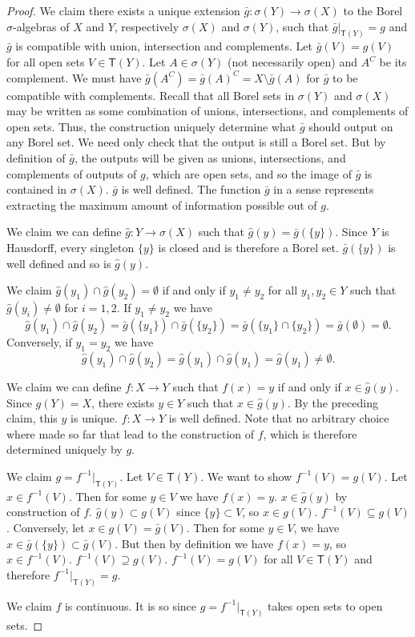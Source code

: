 \documentclass[review]{elsarticle}
\theoremstyle{plain}%
\theoremstyle{definition}
\theoremstyle{remark}
\begin{document}
\begin{proof}
	We claim there exists a unique extension $\bar{g}:\sigma(Y)\to\sigma(X)$ to the Borel $\sigma$-algebras of $X$ and $Y$, respectively $\sigma(X)$ and $\sigma(Y)$, such that $\bar{g}|_{\mathsf{T}(Y)}=g$ and $\bar{g}$ is compatible with union, intersection and complements. Let $\bar{g}(V) = g(V)$ for all open sets $V \in \mathsf{T}(Y)$. Let $A \in \sigma(Y)$ (not necessarily open) and $A^C$ be its complement. We must have $\bar{g}(A^C) = \bar{g}(A)^C = X\setminus \bar{g}(A)$ for $\bar{g}$ to be compatible with complements. Recall that all Borel sets in $\sigma(Y)$ and $\sigma(X)$ may be written as some combination of unions, intersections, and complements of open sets. Thus, the construction uniquely determine what $\bar{g}$ should output on any Borel set. We need only check that the output is still a Borel set. But by definition of $\bar{g}$, the outputs will be given as unions, intersections, and complements of outputs of $g$, which are open sets, and so the image of $\bar{g}$ is contained in $\sigma(X)$.  $\bar{g}$ is well defined. The function $\bar{g}$ in a sense represents extracting the maximum amount of information possible out of $g$.
	
	We claim we can define $\hat{g}:Y\to\sigma(X)$ such that $\hat{g}(y) = \bar{g}(\{y\})$. Since $Y$ is Hausdorff, every singleton $\{y\}$ is closed and is therefore a Borel set. $\bar{g}(\{y\})$ is well defined and so is $\hat{g}(y)$.
	
	We claim  $\hat{g}(y_1)\cap\hat{g}(y_2) = \emptyset$ if and only if $y_1\neq y_2$ for all $y_1,y_2\in Y$ such that $\hat{g}(y_i)\neq\emptyset$ for $i=1,2$. If $y_1\neq y_2$ we have
	$$
	\hat{g}(y_1)\cap\hat{g}(y_2) = \bar{g}(\{y_1\})\cap\bar{g}(\{y_2\}) = \bar{g}(\{y_1\}\cap\{y_2\}) = \bar{g}(\emptyset) = \emptyset.
	$$
	Conversely, if $y_1 = y_2$ we have
	$$
	\hat{g}(y_1)\cap\hat{g}(y_2) = 	\hat{g}(y_1)\cap\hat{g}(y_1) = 
	\hat{g}(y_1) \neq \emptyset.
	$$
	
	We claim we can define $f: X\to Y$ such that $f(x) = y$ if and only if $x\in \hat{g}(y)$. Since $g(Y)=X$, there exists $y\in Y$ such that $x\in\hat{g}(y)$. By the preceding claim, this $y$ is unique. $f: X\to Y$ is well defined. Note that no arbitrary choice where made so far that lead to the construction of $f$, which is therefore determined uniquely by $g$. 
	
	We claim $g = f^{-1} |_{\mathsf{T}(Y)}$. Let $V\in\mathsf{T}(Y)$. We want to show $f^{-1}(V) = g(V)$. Let $x\in f^{-1}(V)$. Then for some $y \in V$ we have $f(x)=y$. $x\in \hat{g}(y)$ by construction of $f$. $\hat{g}(y) \subset g(V)$ since $\{y\}\subset V$, so $x\in g(V)$. $f^{-1}(V) \subseteq g(V)$. Conversely, let $x\in g(V)=\bar{g}(V)$. Then for some $y\in V$, we have $x\in\bar{g}(\{y\})\subset\bar{g}(V)$. But then by definition we have $f(x)=y$, so $x\in f^{-1}(V)$. $f^{-1}(V) \supseteq g(V)$. $f^{-1}(V) = g(V)$ for all $V\in\mathsf{T}(Y)$ and therefore $f^{-1}|_{\mathsf{T}(Y)}=g$.
	
	We claim $f$ is continuous. It is so since $g = f^{-1} |_{\mathsf{T}(Y)}$ takes open sets to open sets. 
\end{proof}
\end{document}
